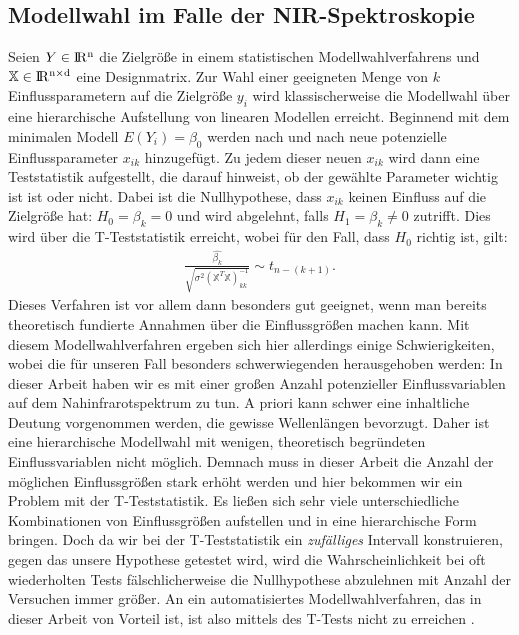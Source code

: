 	\subsection{Modellwahl im Falle der NIR-Spektroskopie}
	\label{ssec:modellwahl_nir}
	Seien $Y\in \rm I\!R^{n}$ die Zielgröße in einem statistischen Modellwahlverfahrens und $\mathbb{X} \in \rm I\!R^{n \times d}$ eine Designmatrix.
	Zur Wahl einer geeigneten Menge von $k$ Einflussparametern auf die Zielgröße $y_i$  wird klassischerweise die Modellwahl über eine hierarchische Aufstellung von linearen Modellen erreicht. Beginnend mit dem minimalen Modell $E(Y_i) = \beta_0$ werden nach und nach neue potenzielle Einflussparameter $x_{ik}$ hinzugefügt. Zu jedem dieser neuen $x_{ik}$ wird dann eine Teststatistik aufgestellt, die darauf hinweist, ob der gewählte Parameter wichtig ist ist oder nicht. Dabei ist die Nullhypothese, dass $x_{ik}$ keinen Einfluss auf die Zielgröße hat: $ H_0 = \beta_k = 0$ und wird abgelehnt, falls $H_1 = \beta_k \neq 0$ zutrifft.
	Dies wird über die T-Teststatistik erreicht,  wobei für den Fall, dass $H_0$ richtig ist, gilt:
	\begin{align*}
		\frac{\hat{\beta_k}}{\sqrt{\sigma^2(\mathbb{X}^T\mathbb{X})^{-1}_{kk}}} \sim t_{n-(k+1)}.
	\end{align*}
	Dieses Verfahren ist vor allem dann besonders gut geeignet, wenn man bereits theoretisch fundierte Annahmen über die Einflussgrößen machen kann.
	Mit diesem Modellwahlverfahren ergeben sich hier allerdings einige Schwierigkeiten, wobei die für unseren Fall besonders schwerwiegenden herausgehoben werden: In dieser Arbeit haben wir es mit einer großen Anzahl potenzieller Einflussvariablen auf dem Nahinfrarotspektrum zu tun. A priori kann schwer eine inhaltliche Deutung vorgenommen werden, die gewisse Wellenlängen bevorzugt. Daher ist eine hierarchische Modellwahl mit wenigen, theoretisch begründeten Einflussvariablen nicht möglich. Demnach muss in dieser Arbeit die Anzahl der möglichen Einflussgrößen stark erhöht werden und hier bekommen wir ein Problem mit der T-Teststatistik. Es ließen sich sehr viele unterschiedliche Kombinationen von Einflussgrößen aufstellen und in eine hierarchische Form bringen. Doch da wir bei der T-Teststatistik ein \textit{zufälliges} Intervall konstruieren, gegen das unsere Hypothese getestet wird, wird die Wahrscheinlichkeit bei oft wiederholten Tests fälschlicherweise die Nullhypothese abzulehnen mit Anzahl der Versuchen immer größer. An ein automatisiertes Modellwahlverfahren, das in dieser Arbeit von Vorteil ist, ist also mittels des T-Tests nicht zu erreichen \cite{Schumacher.2019}.
